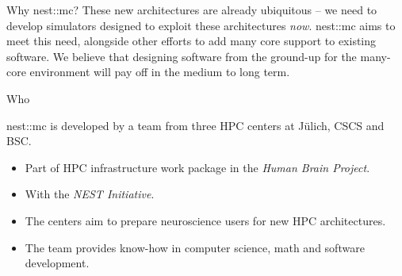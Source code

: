 \documentclass[a0paper,portrait]{baposter}
\newcommand{\nestmc}{{\textcolor{blue!30!black}{nest::mc}}\xspace}
\newcommand{\julich}{J\"ulich\xspace}
\newcommand{\newemph}[1]{{\color{blue!40!black}\em #1}}
\begin{document}
\begin{poster}
\begin{posterbox}[name=motivation,column=0,row=0,span=2]{Why \nestmc?}
    These new architectures are already ubiquitous -- we need to develop simulators designed to exploit these architectures \newemph{now}.
    \nestmc aims to meet this need, alongside other efforts to add many core support to existing software.
    We believe that designing software from the ground-up for the many-core environment will pay off in the medium to long term.


\end{posterbox}

\begin{posterbox}[name=who,column=0,below=motivation,span=1]{Who}
    \begin{center}
        \nestmc is developed by a team from three HPC centers at \julich, CSCS and BSC.
    \end{center}
    \vspace{-10pt}
    \begin{itemize}
        \item Part of HPC infrastructure work package in the \newemph{Human Brain Project}.
        \item With the \newemph{NEST Initiative}.
        \item The centers aim to prepare neuroscience users for new HPC architectures.
        \item The team provides know-how in computer science, math and software development.
    \end{itemize}
\end{posterbox}


\end{poster}
\end{document}
